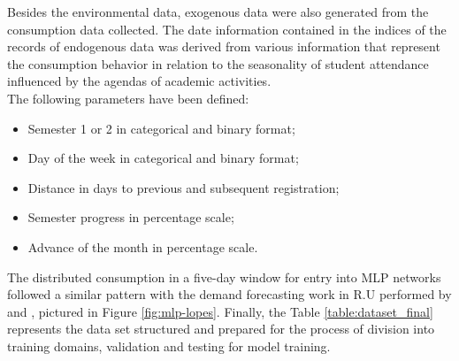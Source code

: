      	  Besides the environmental data, exogenous data were also generated from the consumption data collected. The date information contained in the indices of the records of endogenous data was derived from various information that represent the consumption behavior in relation to the seasonality of student attendance influenced by the agendas of academic activities.\\
            	The following parameters have been defined:
            	\begin{itemize}
            	    \item Semester 1 or 2 in categorical and binary format;
            	    \item Day of the week in categorical and binary format;
            	    \item Distance in days to previous and subsequent registration;
            	    \item Semester progress in percentage scale;
            	    \item Advance of the month in percentage scale.
            	\end{itemize}
            	
            	The distributed consumption in a five-day window for entry into MLP networks followed a similar pattern with the demand forecasting work in R.U performed by  and , pictured in Figure \ref{fig:mlp-lopes}. Finally, the Table \ref{table:dataset_final} represents the data set structured and prepared for the process of division into training domains, validation and testing for model training.

